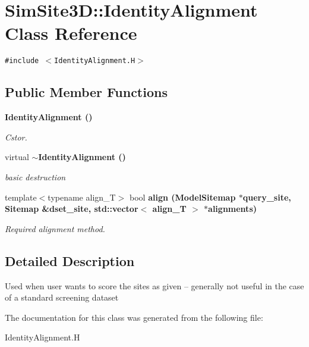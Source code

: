 \section{SimSite3D::Identity\-Alignment Class Reference}
\label{classSimSite3D_1_1IdentityAlignment}
{\tt \#include $<$Identity\-Alignment.H$>$}

\subsection*{Public Member Functions}
\begin{CompactItemize}
\item 
\bf{Identity\-Alignment} ()\label{classSimSite3D_1_1IdentityAlignment_797fcc9db55bc0f73d3c07355627983f}

\begin{CompactList}\small\item\em Cstor. \item\end{CompactList}\item 
virtual \bf{$\sim$Identity\-Alignment} ()\label{classSimSite3D_1_1IdentityAlignment_2fb1a7e4efddaba4b1c392884aab7782}

\begin{CompactList}\small\item\em basic destruction \item\end{CompactList}\item 
template$<$typename align\_\-T$>$ bool \bf{align} (\bf{Model\-Sitemap} $\ast$query\_\-site, \bf{Sitemap} \&dset\_\-site, std::vector$<$ align\_\-T $>$ $\ast$alignments)\label{classSimSite3D_1_1IdentityAlignment_3ac828753736d937a23ff2f92394ecc3}

\begin{CompactList}\small\item\em Required alignment method. \item\end{CompactList}\end{CompactItemize}


\subsection{Detailed Description}
Used when user wants to score the sites as given -- generally not useful in the case of a standard screening dataset 



The documentation for this class was generated from the following file:\begin{CompactItemize}
\item 
Identity\-Alignment.H\end{CompactItemize}
